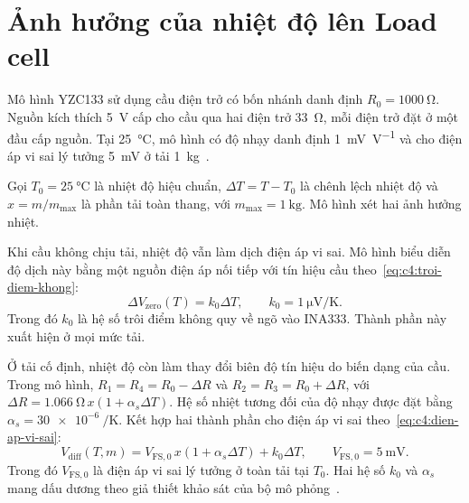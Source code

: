 \section{Ảnh hưởng của nhiệt độ lên Load cell}
\label{sec:c4:anh-huong-nhiet}

Mô hình YZC133 sử dụng cầu điện trở có bốn nhánh danh định
$R_0=\qty{1000}{\ohm}$. Nguồn kích thích \qty{5}{\volt} cấp cho cầu
qua hai điện trở \qty{33}{\ohm}, mỗi điện trở đặt ở một đầu cấp nguồn.
Tại \qty{25}{\celsius}, mô hình có độ nhạy danh định
\qty{1}{\milli\volt\per\volt} và cho điện áp vi sai lý tưởng
\qty{5}{\milli\volt} ở tải \qty{1}{\kilo\gram}~\cite{c4_mo_hinh}.

Gọi $T_0=\qty{25}{\celsius}$ là nhiệt độ hiệu chuẩn,
$\Delta T=T-T_0$ là chênh lệch nhiệt độ và
$x=m/m_{\max}$ là phần tải toàn thang, với
$m_{\max}=\qty{1}{\kilo\gram}$. Mô hình xét hai ảnh hưởng nhiệt.

Khi cầu không chịu tải, nhiệt độ vẫn làm dịch điện áp vi sai.
Mô hình biểu diễn độ dịch này bằng một nguồn điện áp nối tiếp với tín hiệu
cầu theo~\eqref{eq:c4:troi-diem-khong}:
\begin{equation}
    \Delta V_{\mathrm{zero}}(T)=k_0\Delta T,
    \qquad k_0=\qty{1}{\micro\volt\per\kelvin}.
    \label{eq:c4:troi-diem-khong}
\end{equation}
Trong đó $k_0$ là hệ số trôi điểm không quy về ngõ vào INA333.
Thành phần này xuất hiện ở mọi mức tải.

Ở tải cố định, nhiệt độ còn làm thay đổi biên độ tín hiệu do biến dạng
của cầu. Trong mô hình, $R_1=R_4=R_0-\Delta R$ và
$R_2=R_3=R_0+\Delta R$, với
$\Delta R=\qty{1.066}{\ohm}\,x(1+\alpha_s\Delta T)$.
Hệ số nhiệt tương đối của độ nhạy được đặt bằng
$\alpha_s=\qty{30e-6}{\per\kelvin}$. Kết hợp hai thành phần cho điện áp
vi sai theo~\eqref{eq:c4:dien-ap-vi-sai}:
\begin{equation}
    V_{\mathrm{diff}}(T,m)
    = V_{\mathrm{FS},0}\,x(1+\alpha_s\Delta T)+k_0\Delta T,
    \qquad V_{\mathrm{FS},0}=\qty{5}{\milli\volt}.
    \label{eq:c4:dien-ap-vi-sai}
\end{equation}
Trong đó $V_{\mathrm{FS},0}$ là điện áp vi sai lý tưởng ở toàn tải tại
$T_0$. Hai hệ số $k_0$ và $\alpha_s$ mang dấu dương theo giả thiết khảo
sát của bộ mô phỏng~\cite{c4_mo_hinh}.


